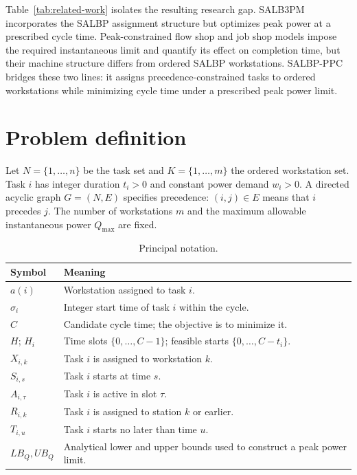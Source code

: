 \documentclass[]{interact}
\theoremstyle{plain}
\theoremstyle{definition}
\theoremstyle{remark}
\newcommand{\Problem}{SALBP-PPC}
\newcommand{\Qmax}{Q_{\max}}
\begin{document}
Table~\ref{tab:related-work} isolates the resulting research gap. SALB3PM incorporates the SALBP assignment structure but optimizes peak power at a prescribed cycle time. Peak-constrained flow shop and job shop models impose the required instantaneous limit and quantify its effect on completion time, but their machine structure differs from ordered SALBP workstations. \Problem{} bridges these two lines: it assigns precedence-constrained tasks to ordered workstations while minimizing cycle time under a prescribed peak power limit.

\section{Problem definition}
\label{sec:problem}

Let $N=\{1,\ldots,n\}$ be the task set and $K=\{1,\ldots,m\}$ the ordered workstation set. Task $i$ has integer duration $t_i>0$ and constant power demand $w_i>0$. A directed acyclic graph $G=(N,E)$ specifies precedence: $(i,j)\in E$ means that $i$ precedes $j$. The number of workstations $m$ and the maximum allowable instantaneous power $\Qmax$ are fixed.

\begin{table}[t!]
\centering
\caption{Principal notation.}
\label{tab:notation}
\small
\renewcommand{\arraystretch}{1.15}
\begin{tabularx}{\textwidth}{@{} l Y @{}}
\toprule
Symbol & Meaning \\
\midrule
$a(i)$ & Workstation assigned to task $i$. \\
$\sigma_i$ & Integer start time of task $i$ within the cycle. \\
$C$ & Candidate cycle time; the objective is to minimize it. \\
$H$; $H_i$ & Time slots $\{0,\ldots,C-1\}$; feasible starts $\{0,\ldots,C-t_i\}$. \\
$X_{i,k}$ & Task $i$ is assigned to workstation $k$. \\
$S_{i,s}$ & Task $i$ starts at time $s$. \\
$A_{i,\tau}$ & Task $i$ is active in slot $\tau$. \\
$R_{i,k}$ & Task $i$ is assigned to station $k$ or earlier. \\
$T_{i,u}$ & Task $i$ starts no later than time $u$. \\
$LB_Q,UB_Q$ & Analytical lower and upper bounds used to construct a peak power limit. \\
\bottomrule
\end{tabularx}
\end{table}
\end{document}
